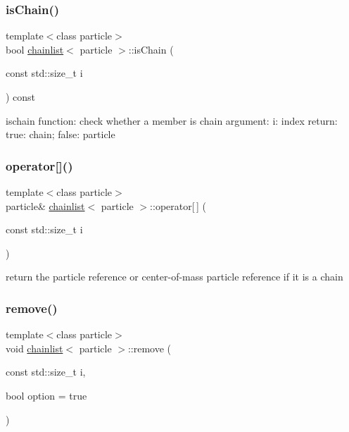 \hypertarget{classchainlist_a49171f851e7b8e44bcc5022e1e07e433}{}\label{classchainlist_a49171f851e7b8e44bcc5022e1e07e433} 
\subsubsection{\texorpdfstring{is\+Chain()}{isChain()}}
{\footnotesize\ttfamily template$<$class particle$>$ \\
bool \hyperlink{classchainlist}{chainlist}$<$ particle $>$\+::is\+Chain (\begin{DoxyParamCaption}\item[{const std\+::size\+\_\+t}]{i }\end{DoxyParamCaption}) const\hspace{0.3cm}{\ttfamily [inline]}}



ischain function\+: check whether a member is chain argument\+: i\+: index return\+: true\+: chain; false\+: particle 

\hypertarget{classchainlist_aa455ef096d73bb70d9b6e2191e2062ce}{}\label{classchainlist_aa455ef096d73bb70d9b6e2191e2062ce} 
\subsubsection{\texorpdfstring{operator[]()}{operator[]()}}
{\footnotesize\ttfamily template$<$class particle$>$ \\
particle\& \hyperlink{classchainlist}{chainlist}$<$ particle $>$\+::operator\mbox{[}$\,$\mbox{]} (\begin{DoxyParamCaption}\item[{const std\+::size\+\_\+t}]{i }\end{DoxyParamCaption})\hspace{0.3cm}{\ttfamily [inline]}}



return the particle reference or center-\/of-\/mass particle reference if it is a chain 

\hypertarget{classchainlist_a528ffec696df61f2895acf7abbf11cbc}{}\label{classchainlist_a528ffec696df61f2895acf7abbf11cbc} 
\subsubsection{\texorpdfstring{remove()}{remove()}}
{\footnotesize\ttfamily template$<$class particle$>$ \\
void \hyperlink{classchainlist}{chainlist}$<$ particle $>$\+::remove (\begin{DoxyParamCaption}\item[{const std\+::size\+\_\+t}]{i,  }\item[{bool}]{option = {\ttfamily true} }\end{DoxyParamCaption})\hspace{0.3cm}{\ttfamily [inline]}}



